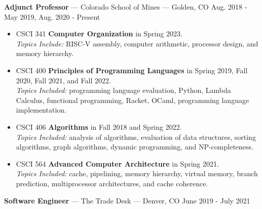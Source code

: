 \documentclass[10pt,letterpaper]{article}
\begin{document}
\textbf{Adjunct Professor} --- Colorado School of Mines --- Golden, CO
\hfill Aug. 2018 - May 2019, Aug. 2020 - Present
\begin{itemize}
    \item CSCI 341 \textbf{Computer Organization} in Spring 2023. \\
        \textit{Topics Include:} RISC-V assembly, computer arithmetic, processor
        design, and memory hierarchy.
    \item CSCI 400 \textbf{Principles of Programming Languages} in Spring
        2019, Fall 2020, Fall 2021, and Fall 2022. \\
        \textit{Topics Included:} programming language evaluation, Python,
        Lambda Calculus, functional programming, Racket, OCaml, programming
        language implementation.
    \item CSCI 406 \textbf{Algorithms} in Fall 2018 and Spring 2022. \\
        \textit{Topics Included:} analysis of algorithms, evaluation of data
        structures, sorting algorithms, graph algorithms, dynamic programming,
        and NP-completeness.
    \item CSCI 564 \textbf{Advanced Computer Architecture} in Spring 2021. \\
        \textit{Topics Included:} cache, pipelining, memory hierarchy, virtual
        memory, branch prediction, multiprocessor architectures, and cache
        coherence.
\end{itemize}

\textbf{Software Engineer} --- The Trade Desk --- Denver, CO
\hfill June 2019 - July 2021



\end{document}
